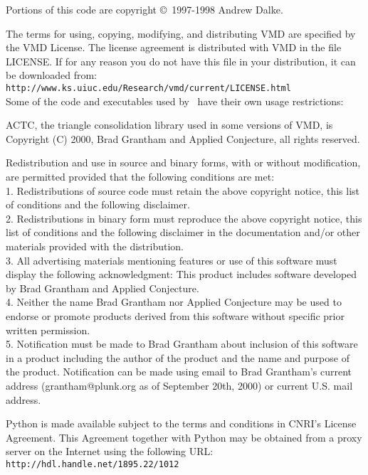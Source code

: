 \noindent
Portions of this code are copyright \copyright\ 1997-1998 Andrew Dalke.

\bigskip

The terms for using, copying, modifying, and distributing VMD are
specified by the VMD License.  The license agreement is distributed
with VMD in the file LICENSE. If for any reason you do not have this
file in your distribution, it can be downloaded from: \\ 
{\tt http://www.ks.uiuc.edu/Research/vmd/current/LICENSE.html} 
\\
Some of the code and executables used by \VMD\ have their own 
usage restrictions:  
\begin{itemize}

ACTC, the triangle consolidation library used in some versions of VMD,
is Copyright (C) 2000, Brad Grantham and Applied Conjecture,
all rights reserved.

Redistribution and use in source and binary forms, with or without
modification, are permitted provided that the following conditions
are met:
\\
  1. Redistributions of source code must retain the above copyright
     notice, this list of conditions and the following disclaimer.
\\
  2. Redistributions in binary form must reproduce the above copyright
     notice, this list of conditions and the following disclaimer in the
     documentation and/or other materials provided with the distribution.
\\
  3. All advertising materials mentioning features or use of this software
     must display the following acknowledgment:
       This product includes software developed by Brad Grantham and
       Applied Conjecture.
\\
  4. Neither the name Brad Grantham nor Applied Conjecture
     may be used to endorse or promote products derived from this software
     without specific prior written permission.
\\
  5. Notification must be made to Brad Grantham about inclusion of this
     software in a product including the author of the product and the name
     and purpose of the product.  Notification can be made using email
     to Brad Grantham's current address (grantham@plunk.org as of September
     20th, 2000) or current U.S. mail address.

Python is made available subject to the terms and conditions in CNRI's
License Agreement. This Agreement together with Python may be
obtained from a proxy server on the Internet using the following
URL: {\tt http://hdl.handle.net/1895.22/1012}


\end{itemize}
